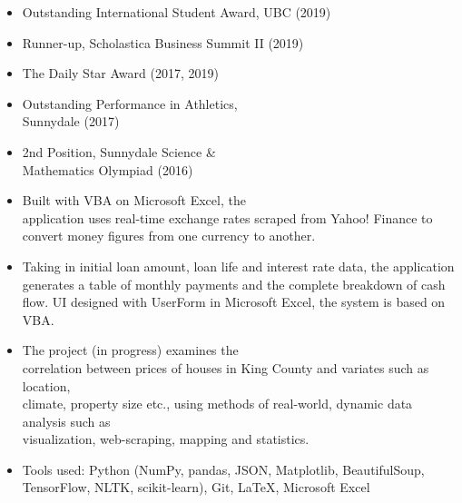 

\begin{itemize}
    \item Outstanding International Student Award, UBC (2019)
    \item Runner-up, Scholastica Business Summit II (2019)
    \item The Daily Star Award (2017, 2019)
    \item Outstanding Performance in Athletics, \\Sunnydale (2017)
    \item 2nd Position, Sunnydale Science \& \\Mathematics Olympiad (2016)
    
\end{itemize}


\begin{itemize}
    \item Built with VBA on Microsoft Excel, the \\application uses real-time exchange rates scraped from Yahoo! Finance to convert money figures from one currency to another.
\end{itemize}

\smallskip


\begin{itemize}

    \item Taking in initial loan amount, loan life and interest rate data, the application generates a table of monthly payments and the complete breakdown of cash flow. UI designed with UserForm in Microsoft Excel, the system is based on VBA.
\end{itemize}

\smallskip


\begin{itemize}
    \item The  project (in  progress) examines  the \\correlation  between  prices  of  houses  in  King  County  and  variates  such  as  location,  \\climate, property size etc., using methods of real-world, dynamic data analysis such as \\visualization, web-scraping, mapping and statistics.
    \item Tools used: Python (NumPy, pandas, JSON, Matplotlib, BeautifulSoup, TensorFlow, NLTK, scikit-learn), Git, LaTeX, Microsoft Excel
\end{itemize}

